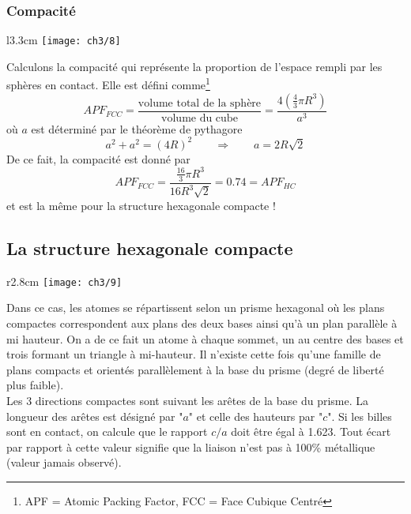 			\subsubsection{Compacité}
			\begin{wrapfigure}[5]{l}{3.3cm}
			\vspace{-5mm}
			\texttt{[image: ch3/8]}
			\end{wrapfigure}
			Calculons la compacité qui représente la proportion de l'espace rempli par les sphères en contact. Elle est défini comme\footnote{APF = Atomic Packing Factor, FCC = Face Cubique Centré}
				\begin{equation}
					APF_{FCC} = \frac{\mbox{volume total de la sphère}}{\mbox{volume du cube}} = \frac{4\left( \frac{4}{3}\pi R^3 \right)}{a^3}					
				\end{equation}					
				où $a$ est déterminé par le théorème de pythagore
				\begin{equation}
					a^2+a^2 = (4R)^2 \qquad \Rightarrow \qquad a = 2R\sqrt{2}
				\end{equation}
				De ce fait, la compacité est donné par 
				\begin{equation}
					APF_{FCC} = \frac{\frac{16}{3}\pi R^3}{16R^3\sqrt{2}} = 0.74 = APF_{HC}
				\end{equation}
				et est la même pour la structure hexagonale compacte !
		\subsection{La structure hexagonale compacte}
			\begin{wrapfigure}[6]{r}{2.8cm}
			\vspace{-5mm}
			\texttt{[image: ch3/9]}
			\end{wrapfigure}
			Dans ce cas, les atomes se répartissent selon un prisme hexagonal où les plans compactes correspondent aux plans des deux bases ainsi qu'à un plan parallèle à mi hauteur. On a de ce fait un atome à chaque sommet, un au centre des bases et trois formant un triangle à mi-hauteur. Il n'existe cette fois qu'une famille de plans compacts et orientés parallèlement à la base du prisme (degré de liberté plus faible). \\
			Les 3 directions compactes sont suivant les arêtes de la base du prisme. La longueur des arêtes est désigné par "$a$" et celle des hauteurs par "$c$". Si les billes sont en contact, on calcule que le rapport $c/a$ doit être égal à 1.623. Tout écart par rapport à cette valeur signifie que la liaison n'est pas à 100\% métallique (valeur jamais observé).
			
